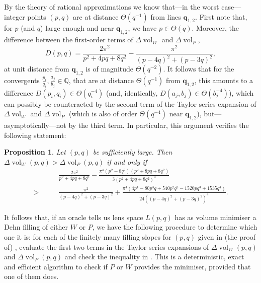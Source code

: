 \documentclass[a4paper]{gtart}
\newtheorem{proposition}{Proposition}[section]
\theoremstyle{definition}
\theoremstyle{remark}
\numberwithin{equation}{section}
\DeclareMathOperator{\vol}{vol}
\begin{document}
By the theory of rational approximations we know that---in the worst case---integer points $(p,q)$ are at distance 
$\Theta\left(q^{-1}\right)$ from lines $\mathbf{q}_{1,2}$. First note that, for 
$p$ (and $q$) large enough and near $\mathbf{q}_{1,2}$, we have $p \in \Theta(q)$. Moreover, the
difference between the first-order terms of $\Delta \vol_W$ and $\Delta \vol_P$,
\[D(p,q) = \frac{2 \pi^2}{p^2 + 4 p q + 8 q^2} - \frac{\pi^2}{(p - 4 q)^2 + (p - 3 q)^2},\] 
at unit distance from $\mathbf{q}_{1,2}$ is of magnitude $\Theta\left(q^{-2}\right)$. 
It follows that for the convergents $\frac{p_i}{q_i}, \frac{a_j}{b_j} \in \mathbb{Q}$, that
are at distance $\Theta\left(q^{-1}\right)$ from $\mathbf{q}_{1,2}$, this amounts to 
a difference $D(p_i,q_i) \in \Theta\left(q_i^{-4}\right)$ (and, identically, 
$D(a_j,b_j) \in \Theta\left(b_j^{-4}\right)$), which can possibly be counteracted 
by the second term of the Taylor series expansion of $\Delta \vol_W$ and $\Delta \vol_P$
(which is also of order $\Theta\left(q^{-4}\right)$ near $\mathbf{q}_{1,2}$), 
but---asymptotically---not by the third term. In particular, this argument verifies the
following statement:

\begin{proposition}
  \label{prop:twoterms}
  Let $(p,q)$ be sufficiently large. Then $\Delta \vol_W (p,q) > \Delta \vol_P (p,q)$ if and only if
  \begin{align*}
   &\frac{2 \pi^2}{p^2 + 4 p q + 8 q^2} - \frac{\pi^4 (p^2 - 8 q^2) (p^2 + 8 p q + 8 q^2)}{3 (p^2 + 4 p q + 8 q^2)^4} \\
    >\qquad  &\frac{\pi^2}{(p - 4 q)^2 + (p - 3 q)^2} +
\frac{\pi^4 (4 p^4 - 80 p^3 q + 540 p^2 q^2 - 1520 p q^3 + 1535 q^4)}{24 ((p - 4 q)^2 + (p - 3 q)^2)^4}.
\end{align*} 
\end{proposition}

It follows that, if an oracle tells us lens space $L(p,q)$ has as volume minimiser a Dehn 
filling of either $W$ or $P$, we have the following procedure to determine which one it 
is: for each of the finitely many filling slopes for $(p,q)$ given in (the proof of) 
, evaluate the first two terms in the Taylor series expansions
of $\Delta \vol_W (p,q)$ and $\Delta \vol_P (p,q)$ and check the inequality in 
. This is a deterministic, exact and efficient algorithm to check if 
$P$ or $W$ provides the minimiser, provided that one of them does.



\end{document}
